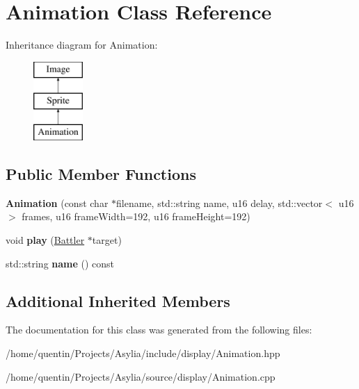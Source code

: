 \hypertarget{classAnimation}{\section{Animation Class Reference}
\label{classAnimation}
}
Inheritance diagram for Animation\-:\begin{figure}[H]
\begin{center}
\leavevmode
\includegraphics[height=3.000000cm]{classAnimation}
\end{center}
\end{figure}
\subsection*{Public Member Functions}
\begin{DoxyCompactItemize}
\item 
\hypertarget{classAnimation_a0dd517adfab513455eadab94fad105bb}{{\bfseries Animation} (const char $\ast$filename, std\-::string name, u16 delay, std\-::vector$<$ u16 $>$ frames, u16 frame\-Width=192, u16 frame\-Height=192)}\label{classAnimation_a0dd517adfab513455eadab94fad105bb}

\item 
\hypertarget{classAnimation_a5dd394af4c0a5ee6ae84ff80ae15d3af}{void {\bfseries play} (\hyperlink{classBattler}{Battler} $\ast$target)}\label{classAnimation_a5dd394af4c0a5ee6ae84ff80ae15d3af}

\item 
\hypertarget{classAnimation_aa04c1b77a06e3e161063fb5c48a76042}{std\-::string {\bfseries name} () const }\label{classAnimation_aa04c1b77a06e3e161063fb5c48a76042}

\end{DoxyCompactItemize}
\subsection*{Additional Inherited Members}


The documentation for this class was generated from the following files\-:\begin{DoxyCompactItemize}
\item 
/home/quentin/\-Projects/\-Asylia/include/display/Animation.\-hpp\item 
/home/quentin/\-Projects/\-Asylia/source/display/Animation.\-cpp\end{DoxyCompactItemize}
